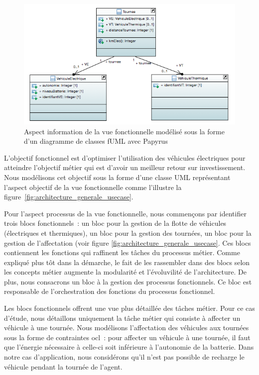 \begin{figure}[!htbp]
 \begin{center}
  \includegraphics[width=1\textwidth]{figures/5_implementation/information_fonctionnelle.png}
 \end{center}
 \caption{Aspect information de la vue fonctionnelle modélisé sous la forme d'un diagramme de classes fUML avec Papyrus}
 \label{fig:information_fonctionnelle}
\end{figure}

L'objectif fonctionnel est d'optimiser
l'utilisation des véhicules électriques pour atteindre l'objectif métier qui est
d'avoir un meilleur retour sur investissement. Nous modélisons cet objectif 
sous la forme d'une classe UML
représentant l'aspect objectif de la vue fonctionnelle comme l'illustre la 
figure~\ref{fig:architecture_generale_usecase}.

Pour l'aspect processus de la vue fonctionnelle, nous commençons par identifier trois blocs fonctionnels~:
un bloc pour la gestion de la flotte de véhicules (électriques et thermiques),
un bloc pour la gestion des tournées, un bloc pour la gestion de l'affectation
(voir figure \ref{fig:architecture_generale_usecase}. Ces blocs contiennent les
fonctions qui raffinent les tâches du processus métier. Comme expliqué plus tôt
dans la démarche, le fait de les rassembler dans des blocs selon les concepts
métier augmente la modularité et l'évoluvilité de l'architecture. De plus, nous
consacrons un bloc à la gestion des processus fonctionnels. Ce bloc est
responsable de l'orchestration des fonctions du processus fonctionnel.

Les blocs fonctionnels offrent une vue plus détaillée des tâches métier. 
Pour ce cas d'étude, nous détaillons uniquement la tâche métier qui consiste à
affecter un véhicule à une tournée. Nous modélisons l'affectation des véhicules 
aux tournées
sous la forme de contraintes \gls{ocl}~: pour affecter un véhicule à une tournée, il
faut que l'énergie nécessaire à celle-ci soit inférieure à l'autonomie de la
batterie. Dans notre cas d'application, nous considérons qu'il n'est pas
possible de recharge le véhicule pendant la tournée de l'agent.

